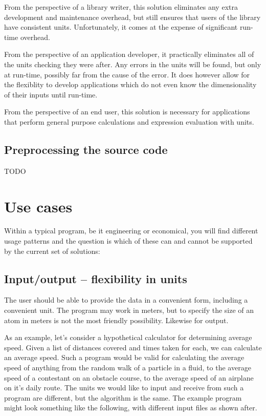 \documentclass{article}
\begin{document}
From the perspective of a library writer, this solution eliminates any extra development and maintenance overhead,
but still ensures that users of the library have consistent units.
Unfortunately, it comes at the expense of significant run-time overhead.

From the perspective of an application developer, it practically eliminates all of the units checking they were after.
Any errors in the units will be found, but only at run-time, possibly far from the cause of the error.
It does however allow for the flexiblity to develop applications which do not even know the dimensionality of their inputs until run-time.

From the perspective of an end user, this solution is necessary for applications that perform general purpose calculations and expression evaluation with units.

\subsection{Preprocessing the source code}
TODO

\section{Use cases}
\label{UseCases}
Within a typical program, be it engineering or economical, you will find different usage patterns and the question is
which of these can and cannot be supported by the current set of solutions:

\subsection*{Input/output -- flexibility in units}
The user should be able to provide the data in a convenient form, including a convenient unit. The program may work in meters,
but to specify the size of an atom in meters is not the most friendly possibility. Likewise for output.

As an example, let's consider a hypothetical calculator for determining average speed.
Given a list of distances covered and times taken for each, we can calculate an average speed.
Such a program would be valid for calculating the average speed of anything from the random walk of a particle in a fluid,
to the average speed of a contestant on an obstacle course,
to the average speed of an airplane on it's daily route.
The units we would like to input and receive from such a program are different, but the algorithm is the same.
The example program might look something like the following, with different input files as shown after.
\end{document}
